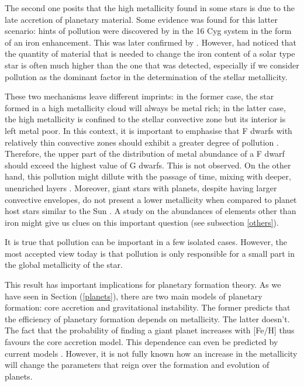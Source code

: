 \documentclass[dvips,12pt,a4paper]{report}
\begin{document}
The second one posits that the high metallicity found in some stars is due to the late accretion of planetary material. Some evidence was found for this latter scenario: hints of pollution were discovered by \citet{Gonzalez-1998} in the 16 Cyg system in the form of an iron enhancement. This was later confirmed by \citet{Laws-2001}. However, \citet{Santos-2001b} had noticed that the quantity of material that is needed to change the iron content of a solar type star is often much higher than the one that was detected, especially if we consider pollution as the dominant factor in the determination of the stellar metallicity. 

These two mechanisms leave different imprints: in the former case, the star formed in a high metallicity cloud will always be metal rich; in the latter case, the high metallicity is confined to the stellar convective zone but its interior is left metal poor. In this context, it is important to emphasise that F dwarfs with relatively thin convective zones should exhibit a greater degree of pollution \citep{Fischer-2005}. Therefore, the upper part of the distribution of metal abundance of a F dwarf should exceed the highest value of G dwarfs. This is not observed. On the other hand, this pollution might dillute with the passage of time, mixing with deeper, unenriched layers \citep{Vauclair-2004}. Moreover, giant stars with planets, despite having larger convective envelopes, do not present a lower metallicity when compared to planet host stars similar to the Sun \citep{Ecuvillon-2006b}. A study on the abundances of elements other than iron might give us clues on this important question (see subsection \ref{others}).

It is true that pollution can be important in a few isolated cases. However, the most accepted view today is that pollution is only responsible for a small part in the global metallicity of the star.

This result has important implications for planetary formation theory. As we have seen in Section (\ref {planets}), there are two main models of planetary formation: core accretion and gravitational instability. The former predicts that the efficiency of planetary formation depends on metallicity. The latter doesn't. The fact that the probability of finding a giant planet increases with [Fe/H] thus favours the core accretion model. This dependence can even be predicted by current models \citep{Ida-2004a}. However, it is not fully known how an increase in the metallicity will change the parameters that reign over the formation and evolution of planets. 
\end{document}

